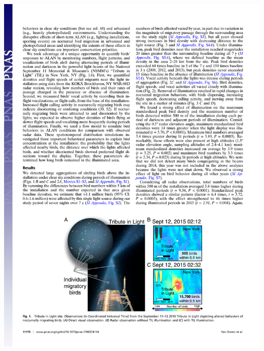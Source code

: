 \documentclass[a4paper, twoside]{templates/ociamthesis}
\begin{document}
\begin{center}\includegraphics[width=1\linewidth]{pdf_chapters/lights/lights_crop_Part2} \end{center}
\end{document}
